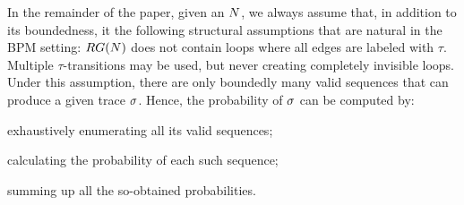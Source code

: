 %
In the remainder of the paper, given an \uswn $N$, we always assume that, in addition to its boundedness, it the following structural assumptions that are natural in the BPM setting:
$RG(N)$ does not contain loops where all edges are labeled with $\tau$.
Multiple $\tau$-transitions may be used, but never creating completely invisible loops. Under this assumption, %
 there are only boundedly many valid sequences that can produce a given  trace $\sigma$. Hence, the probability of $\sigma$ can be computed by:
\begin{inparaenum}[\it (i)]
\item exhaustively enumerating all its valid sequences;
\item calculating the probability of each such sequence;
\item summing up all the so-obtained probabilities.
\end{inparaenum}
